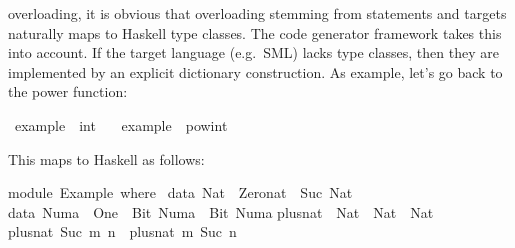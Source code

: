\begin{isabellebody}
\begin{isamarkuptext}
  overloading, it is obvious that overloading stemming from \hyperlink{command.class}{\mbox{}} statements and \hyperlink{command.instantiation}{\mbox{}} targets naturally
  maps to Haskell type classes.  The code generator framework
  \cite{isabelle-codegen} takes this into account.  If the target
  language (e.g.~SML) lacks type classes, then they are implemented by
  an explicit dictionary construction.  As example, let's go back to
  the power function:%
\end{isamarkuptext}%
\isamarkuptrue%
%
\isadelimquote
%
\endisadelimquote
%
\isatagquote
{}\isamarkupfalse%
\ example\ {}{}\ int\ \isanewline
\ \ {}example\ {}\ pow{}int\ {}{}\ {}{}{}{}{}%
\endisatagquote
{\isafoldquote}%
%
\isadelimquote
%
\endisadelimquote
%
\begin{isamarkuptext}%
\noindent This maps to Haskell as follows:%
\end{isamarkuptext}%
\isamarkuptrue%
%
\isadeliminvisible
%
\endisadeliminvisible
%
\isataginvisible
%
\endisataginvisible
{\isafoldinvisible}%
%
\isadeliminvisible
%
\endisadeliminvisible
%
\isadelimquotetypewriter
%
\endisadelimquotetypewriter
%
\isatagquotetypewriter
%
\begin{isamarkuptext}%
module\ Example\ where\ {}\isanewline
\isanewline
data\ Nat\ {}\ Zero{}nat\ {}\ Suc\ Nat{}\isanewline
\isanewline
data\ Numa\ {}\ One\ {}\ Bit{}\ Numa\ {}\ Bit{}\ Numa{}\isanewline
\isanewline
plus{}nat\ {}{}\ Nat\ {}{}\ Nat\ {}{}\ Nat{}\isanewline
plus{}nat\ {}Suc\ m{}\ n\ {}\ plus{}nat\ m\ {}Suc\ n{}{}\isanewline

\end{isamarkuptext}
\end{isabellebody}
